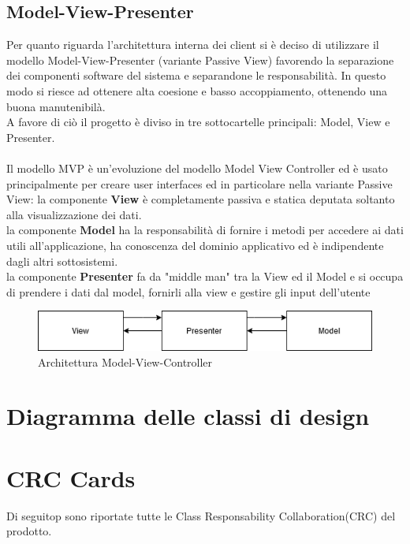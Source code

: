 \subsection{Model-View-Presenter}
Per quanto riguarda l'architettura interna dei client si è deciso di utilizzare il modello Model-View-Presenter (variante Passive View)
favorendo la separazione dei componenti software del sistema e separandone le responsabilità.
In questo modo si riesce ad ottenere alta coesione e basso accoppiamento, ottenendo una buona manutenibilà.\\
A favore di ciò il progetto è diviso in tre sottocartelle principali: Model, View e Presenter.\\
\\
Il modello MVP è un'evoluzione del modello Model View Controller ed è usato principalmente per creare user interfaces 
ed in particolare nella variante Passive View:
la componente \textbf{View} è completamente passiva e statica deputata soltanto alla visualizzazione dei dati.\\
la componente \textbf{Model} ha la responsabilità di fornire i metodi per accedere
ai dati utili all'applicazione, ha conoscenza del dominio applicativo ed è indipendente
dagli altri sottosistemi.\\
la componente \textbf{Presenter} fa da "middle man" tra la View ed il Model e si occupa di prendere i dati dal model, 
fornirli alla view e gestire gli input dell'utente
\begin{center}
    \begin{figure}[H]
        \includegraphics[width=\textwidth]{Figures/MVP client.png}
        \caption{Architettura Model-View-Controller}
    \end{figure}
\end{center}
\section{Diagramma delle classi di design}
{}

\pagebreak

\section{CRC  Cards}
Di seguitop sono riportate tutte le Class Responsability Collaboration(CRC) del prodotto.

